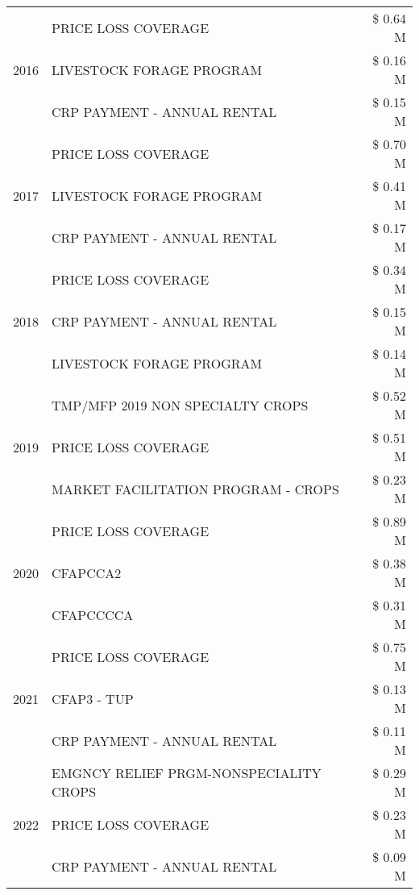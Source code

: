 \begin{tabular}{llr}
\cline{1-3}
\multirow[t]{3}{*}{2016} & PRICE LOSS COVERAGE & \$ 0.64 M \\
 & LIVESTOCK FORAGE PROGRAM & \$ 0.16 M \\
 & CRP PAYMENT - ANNUAL RENTAL & \$ 0.15 M \\
\cline{1-3}
\multirow[t]{3}{*}{2017} & PRICE LOSS COVERAGE & \$ 0.70 M \\
 & LIVESTOCK FORAGE PROGRAM & \$ 0.41 M \\
 & CRP PAYMENT - ANNUAL RENTAL & \$ 0.17 M \\
\cline{1-3}
\multirow[t]{3}{*}{2018} & PRICE LOSS COVERAGE & \$ 0.34 M \\
 & CRP PAYMENT - ANNUAL RENTAL & \$ 0.15 M \\
 & LIVESTOCK FORAGE PROGRAM & \$ 0.14 M \\
\cline{1-3}
\multirow[t]{3}{*}{2019} & TMP/MFP 2019 NON SPECIALTY CROPS & \$ 0.52 M \\
 & PRICE LOSS COVERAGE & \$ 0.51 M \\
 & MARKET FACILITATION PROGRAM - CROPS & \$ 0.23 M \\
\cline{1-3}
\multirow[t]{3}{*}{2020} & PRICE LOSS COVERAGE & \$ 0.89 M \\
 & CFAPCCA2 & \$ 0.38 M \\
 & CFAPCCCCA & \$ 0.31 M \\
\cline{1-3}
\multirow[t]{3}{*}{2021} & PRICE LOSS COVERAGE & \$ 0.75 M \\
 & CFAP3 - TUP & \$ 0.13 M \\
 & CRP PAYMENT - ANNUAL RENTAL & \$ 0.11 M \\
\cline{1-3}
\multirow[t]{3}{*}{2022} & EMGNCY RELIEF PRGM-NONSPECIALITY CROPS & \$ 0.29 M \\
 & PRICE LOSS COVERAGE & \$ 0.23 M \\
 & CRP PAYMENT - ANNUAL RENTAL & \$ 0.09 M \\
\cline{1-3}
\bottomrule
\end{tabular}
